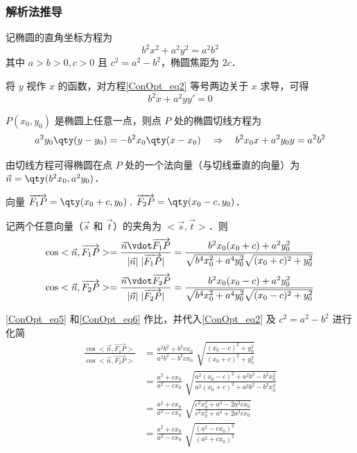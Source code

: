 \subsubsection{解析法推导}
记椭圆的直角坐标方程为
\begin{equation}\label{ConOpt_eq2}
b^2 x^2 +a^2 y^2=a^2 b^2
\end{equation}
其中 $a>b>0,c>0$ 且 $c^2=a^2-b^2$，椭圆焦距为 $2c$．

将 $y$ 视作 $x$ 的函数，对方程\autoref{ConOpt_eq2} 等号两边关于 $x$ 求导，可得
\begin{equation}
b^2 x +a^2 yy'= 0
\end{equation}

$P(x_0,y_0)$ 是椭圆上任意一点，则点 $P$ 处的椭圆切线方程为
\begin{equation}
a^2 y_0 \qty(y - y_0) = - b^2 x_0 \qty(x - x_0) \quad
\Rightarrow \quad
b^2 x_0 x + a^2 y_0 y = a^2 b^2
\end{equation}

由切线方程可得椭圆在点 $P$ 处的一个法向量（与切线垂直的向量）为 $\vec n = \qty(b^2 x_0,a^2 y_0)$．

向量 $\overrightarrow{F_1P}=\qty(x_0 +c,y_0)\; ,\; \overrightarrow{F_2P}=\qty(x_0 -c,y_0)$．

记两个任意向量（$\vec s$ 和 $\vec t$）的夹角为 $<\vec s,\vec t>$．则
\begin{equation}\label{ConOpt_eq5}
\cos<\vec n,\overrightarrow{F_1P}>=\frac{\vec n \vdot \overrightarrow{F_1P}}{|\vec n| \; |\overrightarrow{F_1P}|}= \frac{b^2 x_0 (x_0+c)+a^2 y_0^2}{\sqrt{b^4 x_0^2+a^4 y_0^2}\sqrt{(x_0+c)^2+y_0^2}}
\end{equation}
\begin{equation}\label{ConOpt_eq6}
\cos<\vec n,\overrightarrow{F_2P}>=\frac{\vec n \vdot \overrightarrow{F_2P}}{|\vec n| \; |\overrightarrow{F_2P}|}= \frac{b^2 x_0 (x_0-c)+a^2 y_0^2}{\sqrt{b^4 x_0^2+a^4 y_0^2}\sqrt{(x_0-c)^2+y_0^2}}
\end{equation}

\autoref{ConOpt_eq5} 和\autoref{ConOpt_eq6} 作比，并代入\autoref{ConOpt_eq2} 及 $c^2=a^2-b^2$ 进行化简
\begin{equation}
\begin{aligned}
\frac{\cos<\vec n,\overrightarrow{F_1P}>}{\cos<\vec n,\overrightarrow{F_2P}>} &=\frac{a^2 b^2+b^2cx_0}{a^2 b^2-b^2cx_0}\; \sqrt{\frac{(x_0-c)^2+y_0^2}{(x_0+c)^2+y_0^2}} \\
&=\frac{a^2+cx_0}{a^2-cx_0}\; \sqrt{\frac{a^2(x_0-c)^2 +a^2 b^2-b^2 x_0^2}{a^2(x_0+c)^2 +a^2 b^2-b^2 x_0^2}} \\
&=\frac{a^2+cx_0}{a^2-cx_0}\; \sqrt{\frac{c^2 x_0^2 + a^4 - 2a^2 c x_0}{c^2 x_0^2 + a^4 + 2a^2 c x_0}} \\
&=\frac{a^2+cx_0}{a^2-cx_0}\; \sqrt{\frac{(a^2-cx_0)^2}{(a^2+cx_0)^2}}
\end{aligned}
\end{equation}

